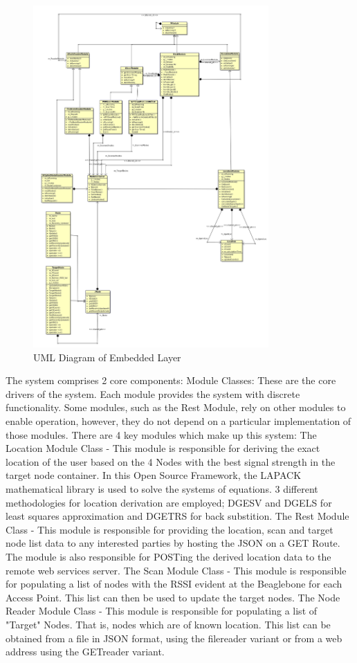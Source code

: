 \documentclass[conference]{IEEEtran}
\begin{document}
\begin{figure}[H]
    \includegraphics[width=9cm,height= 9 cm]{uml_9-5-18.png}
    \caption{UML Diagram of Embedded Layer}
    \end{figure}

The system comprises 2 core components:
\newline
Module Classes: These are the core drivers of the system. Each module provides the system with discrete functionality. Some modules, such as the Rest Module, rely on other modules to enable operation, however, they do not depend on a particular implementation of those modules. \newline
There are 4 key modules which make up this system:
\newline
The Location Module Class - This module is responsible for deriving the exact location of the user based on the 4 Nodes with the best signal strength in the target node container. In this Open Source Framework, the LAPACK mathematical library is used to solve the systems of equations. 3 different methodologies for location derivation are employed; DGESV and DGELS for least squares approximation and DGETRS for back substition.
\newline
The Rest Module Class - This module is responsible for providing the location, scan and target node list data to any interested parties by hosting the JSON on a GET Route. The module is also responsible for POSTing the derived location data to the remote web services server.
\newline
The Scan Module Class - This module is responsible for populating a list of nodes with the RSSI evident at the Beaglebone for each Access Point. This list can then be used to update the target nodes.
\newline
The Node Reader Module Class - This module is responsible for populating a list of "Target" Nodes. That is, nodes which are of known location. This list can be obtained from a file in JSON format, using the filereader variant or from a web address using the GETreader variant.
\newline
 
\end{document}
